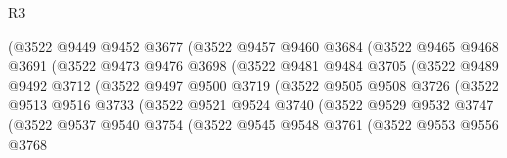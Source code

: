 \begin{lexlean}{R3}
\begin{coremodule}
                          (@3522
                            @9449
                            @9452
                            @3677
                            (@3522
                              @9457
                              @9460
                              @3684
                              (@3522
                                @9465
                                @9468
                                @3691
                                (@3522
                                  @9473
                                  @9476
                                  @3698
                                  (@3522
                                    @9481
                                    @9484
                                    @3705
                                    (@3522
                                      @9489
                                      @9492
                                      @3712
                                      (@3522
                                        @9497
                                        @9500
                                        @3719
                                        (@3522
                                          @9505
                                          @9508
                                          @3726
                                          (@3522
                                            @9513
                                            @9516
                                            @3733
                                            (@3522
                                              @9521
                                              @9524
                                              @3740
                                              (@3522
                                                @9529
                                                @9532
                                                @3747
                                                (@3522
                                                  @9537
                                                  @9540
                                                  @3754
                                                  (@3522
                                                    @9545
                                                    @9548
                                                    @3761
                                                    (@3522
                                                      @9553
                                                      @9556
                                                      @3768

\end{coremodule}
\end{lexlean}
